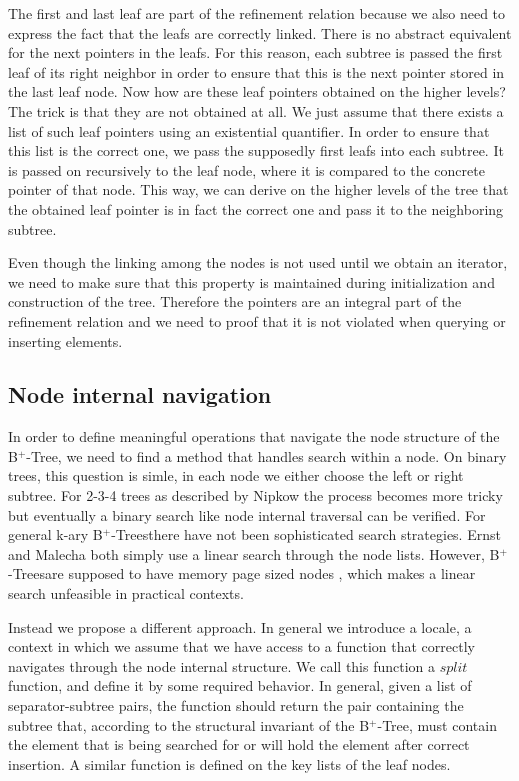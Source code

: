 \documentclass[a4paper,UKenglish,cleveref, autoref, thm-restate]{lipics-v2021}
\newcommand{\btree}{B$^+$-Tree}
\newcommand{\btrees}{B$^+$-Trees}
\begin{document}
The first and last leaf are part of the refinement relation because
we also need to express the fact that the leafs are correctly linked.
There is no abstract equivalent for the next pointers in the leafs.
For this reason, each subtree is passed the first leaf of its right neighbor
in order to ensure that this is the next pointer stored in the last leaf node.
Now how are these leaf pointers obtained on the higher levels?
The trick is that they are not obtained at all.
We just assume that there exists a list of such leaf pointers using an existential quantifier.
In order to ensure that this list is the correct one, we pass the supposedly
first leafs into each subtree.
It is passed on recursively to the leaf node,
where it is compared to the concrete pointer of that node.
This way, we can derive on the higher levels of the tree
that the obtained leaf pointer is in fact the correct one and pass it to the
neighboring subtree.

Even though the linking among the nodes is not used until we obtain
an iterator, we need to make sure that this property is maintained
during initialization and construction of the tree.
Therefore the pointers are an integral part of the refinement relation
and we need to proof that it is not violated when querying or inserting elements.

\subsection{Node internal navigation}
\label{sec:split}

In order to define meaningful operations that navigate
the node structure of the \btree,
we need to find a method that handles search within a node.
On binary trees, this question is simle, in each node we either choose
the left or right subtree.
For 2-3-4 trees as described by Nipkow \cite{DBLP:conf/itp/Nipkow16} the process becomes more tricky
but eventually a binary search like node internal traversal can be verified.
For general k-ary \btrees there have not been sophisticated search strategies.
Ernst \cite{DBLP:journals/sosym/ErnstSR15} and Malecha \cite{DBLP:conf/popl/MalechaMSW10}
both simply use a linear search through the node lists.
However, \btrees are supposed to have memory page sized nodes \cite{DBLP:journals/csur/Comer79}, 
which makes a linear search unfeasible in practical contexts.

Instead we propose a different approach.
In general we introduce a locale, a context in which we assume that we
have access to a function that correctly navigates through the node internal structure.
We call this function a $split$ function, and define it by some required behavior.
In general, given a list of separator-subtree pairs, the function should
return the pair containing the subtree that, according to the structural invariant of the \btree,
must contain the element that is being searched for or will hold the element after correct insertion.
A similar function is defined on the key lists of the leaf nodes.
\end{document}
